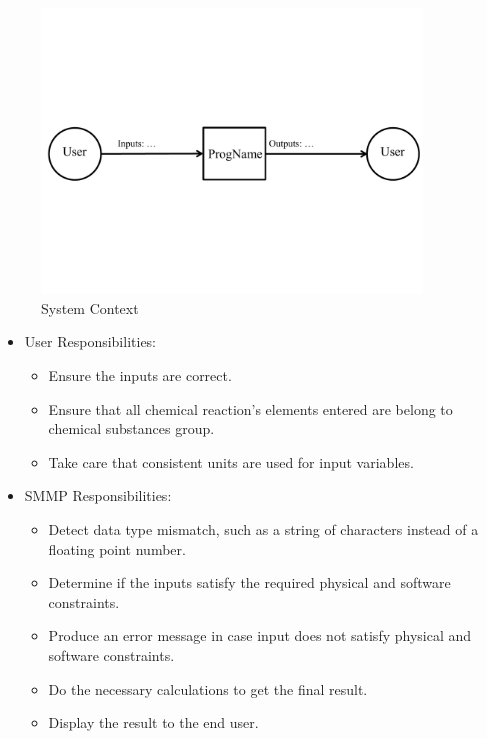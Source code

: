 \documentclass[12pt]{article}
\begin{document}
\begin{figure}[h!]
\begin{center}
 \includegraphics[width=0.9\textwidth]{SystemContextFigure}
\caption{System Context}
\label{Fig_SystemContext} 
\end{center}
\end{figure}


\begin{itemize}
\item User Responsibilities:
\begin{itemize}
\item Ensure the inputs are correct.
\item Ensure that all chemical reaction's elements entered are belong to chemical substances group.
\item Take care that consistent units are used for input variables.
\end{itemize}
\item SMMP Responsibilities:
\begin{itemize}
\item Detect data type mismatch, such as a string of characters instead of a
  floating point number.
\item Determine if the inputs satisfy the required physical and software constraints.
\item Produce an error message in case  input does not satisfy physical and software constraints.
\item Do the necessary calculations to get the final result.
\item Display the result to the end user.
\end{itemize}
\end{itemize}
\end{document}
